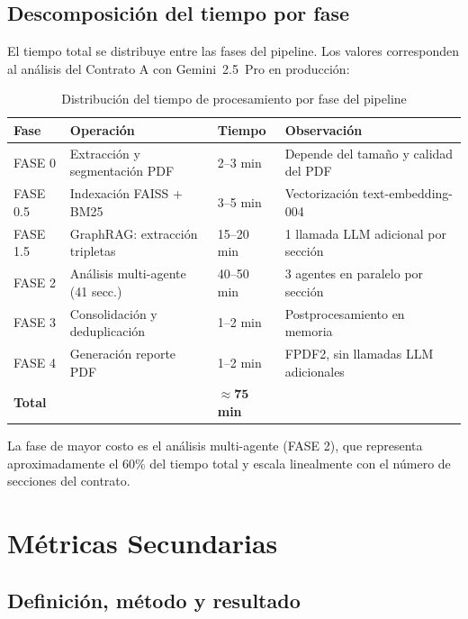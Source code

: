 \subsection{Descomposición del tiempo por fase}

El tiempo total se distribuye entre las fases del pipeline. Los valores
corresponden al análisis del Contrato A con Gemini~2.5~Pro en
producción:

\begin{table}[H]
\centering
\caption{Distribución del tiempo de procesamiento por fase del pipeline}
\label{tab:tiempo_fases}
\begin{tabular}{p{1.5cm} p{4.5cm} p{2.5cm} p{4cm}}
\toprule
\textbf{Fase} & \textbf{Operación} & \textbf{Tiempo} & \textbf{Observación} \\
\midrule
FASE 0   & Extracción y segmentación PDF   & 2--3 min   & Depende del tamaño y calidad del PDF \\
FASE 0.5 & Indexación FAISS + BM25         & 3--5 min   & Vectorización text-embedding-004 \\
FASE 1.5 & GraphRAG: extracción tripletas  & 15--20 min & 1 llamada LLM adicional por sección \\
FASE 2   & Análisis multi-agente (41 secc.)& 40--50 min & 3 agentes en paralelo por sección \\
FASE 3   & Consolidación y deduplicación   & 1--2 min   & Postprocesamiento en memoria \\
FASE 4   & Generación reporte PDF          & 1--2 min   & FPDF2, sin llamadas LLM adicionales \\
\midrule
\textbf{Total} & & $\approx \mathbf{75}$\textbf{ min} & \\
\bottomrule
\end{tabular}
\end{table}

La fase de mayor costo es el análisis multi-agente (FASE 2), que representa
aproximadamente el 60\% del tiempo total y escala linealmente con el número
de secciones del contrato.

\section{Métricas Secundarias}

\subsection{Definición, método y resultado}

